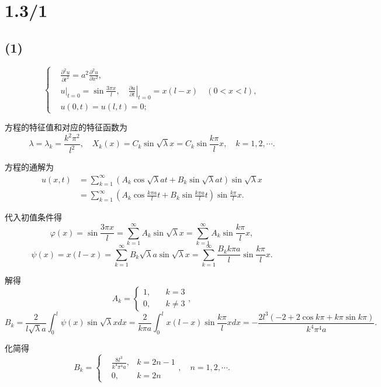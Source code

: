 \documentclass[11pt,a4paper]{article}
\author{刘逸灏 (515370910207)}
\begin{document}
\maketitle

\section{1.3/1}

\subsection*{(1)}

$$
  \left\{\begin{aligned}
     & \frac{\partial^2u}{\partial t^2}=a^2\frac{\partial^2u}{\partial x^2},                                      \\
     & u|_{t=0}=\sin\frac{3\pi x}{l},\quad \left.\frac{\partial u}{\partial t}\right|_{t=0}=x(l-x) \quad (0<x<l), \\
     & u(0,t)=u(l,t)=0;
  \end{aligned}\right.
$$

方程的特征值和对应的特征函数为
$$\lambda=\lambda_k=\frac{k^2\pi^2}{l^2},\quad X_k(x)=C_k\sin\sqrt{\lambda}x=C_k\sin\frac{k\pi}{l}x,\quad k=1,2,\cdots.$$

方程的通解为
\begin{align*}
  u(x,t)
   & =\sum_{k=1}^\infty\left(A_k\cos\sqrt{\lambda}at+
  B_k\sin\sqrt{\lambda}at\right)\sin\sqrt{\lambda}x    \\
   & =\sum_{k=1}^\infty\left(A_k\cos\frac{k\pi a}{l}t+
  B_k\sin\frac{k\pi a}{l}t\right)\sin\frac{k\pi}{l}x.
\end{align*}

代入初值条件得
$$\varphi(x)=\sin\frac{3\pi x}{l}=\sum_{k=1}^\infty A_k\sin\sqrt{\lambda}x=\sum_{k=1}^\infty A_k\sin\frac{k\pi }{l}x,$$
$$\psi(x)=x(l-x)=\sum_{k=1}^\infty B_k\sqrt{\lambda}a\sin\sqrt{\lambda}x=\sum_{k=1}^\infty \frac{B_kk\pi a}{l}\sin\frac{k\pi}{l}x.$$

解得
$$A_k=\left\{\begin{aligned}1, &\quad k = 3 \\ 0, &\quad k\neq 3 \end{aligned}\right.,$$
$$B_k=\frac{2}{l\sqrt{\lambda}a}\int_0^l\psi(x)\sin\sqrt{\lambda}xdx=
  \frac{2}{k\pi a}\int_0^l x(l-x)\sin\frac{k\pi}{l}xdx=-\frac{2l^3(-2+2\cos k\pi+k\pi\sin k\pi)}{k^4\pi^4a}.$$

化简得
$$B_k=\left\{\begin{aligned}&\frac{8l^3}{k^4\pi^4a}, & k = 2n-1 \\ &0, & k=2n \end{aligned}\right.,\quad n=1,2,\cdots.$$
\end{document}
